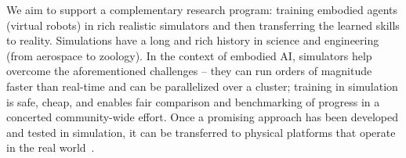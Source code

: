 We aim to support a complementary research program: training embodied agents (\eg virtual robots) in rich realistic simulators and then transferring the learned skills to reality.
Simulations have a long and rich history in science and engineering (from aerospace to zoology).
In the context of embodied AI, simulators help overcome the aforementioned challenges -- they can run orders of magnitude faster than real-time and can be parallelized over a cluster; training in simulation is safe, cheap, and enables fair comparison and benchmarking of progress in a concerted community-wide effort.
%
Once a promising approach has been developed and tested in simulation, it can be transferred to physical platforms that operate in the real world~\cite{sim2real-driving,sim2real-legged}.

